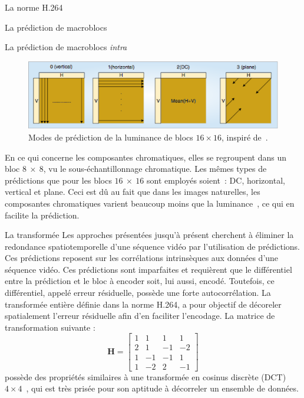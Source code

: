 \documentclass[letterpaper, twoside, 12pt,memoire]{thETS}
\begin{document}
\begin{chapter}{La norme H.264}
\begin{section}{La prédiction de macroblocs}
\begin{subsection}{La prédiction de macroblocs \textit{intra}}
\begin{figure}%
\centering
\includegraphics[width=\linewidth]{images/16x16PredictionModes.png}
\caption{Modes de prédiction de la luminance de blocs $16 \times 16$, inspiré
de~\cite{richardson2003}.}
\label{fig-16x16PredictionModes}
\end{figure}

En ce qui concerne les composantes chromatiques, elles se regroupent dans un
bloc $8~\times~8$, vu le sous-échantillonnage chromatique. Les mêmes types de
prédictions que pour les blocs $16~\times~16$ sont employés soient~: DC,
horizontal, vertical et plane. Ceci est dû au fait que dans les images
naturelles, les composantes chromatiques varient beaucoup moins que la
luminance~\citep{Wang2001}, ce qui en facilite la prédiction.
\end{subsection}
\end{section}


\begin{section}{La transformée}
\newcommand{\ltH}{\mathbf{H}}
Les approches présentées jusqu'à présent cherchent à éliminer la redondance
spatiotemporelle d'une séquence vidéo par l'utilisation de prédictions. Ces
prédictions reposent sur les corrélations intrinsèques aux données d'une
séquence vidéo. Ces prédictions sont imparfaites et requièrent que le
différentiel entre la prédiction et le bloc à encoder soit, lui aussi, encodé.
Toutefois, ce différentiel, appelé erreur résiduelle, possède une forte
autocorrélation. La transformée entière définie dans la norme H.264, a pour
objectif de décoreler spatialement l'erreur résiduelle afin d'en faciliter l'encodage. La
matrice de transformation suivante :
\begin{equation}
\ltH = \begin {bmatrix}
1 & 1 & 1 & 1\\
2 & 1 & -1 & -2\\
1 & -1 & -1 & 1\\
1 & -2 & 2 & -1
\end{bmatrix}
\end{equation}
possède des propriétés similaires à une transformée en cosinus discrète
(DCT) $4 \times 4$~\citep{malvar2003}, qui est très prisée pour son aptitude
à décorreler un ensemble de données.


\end{section}
\end{chapter}
\end{document}
